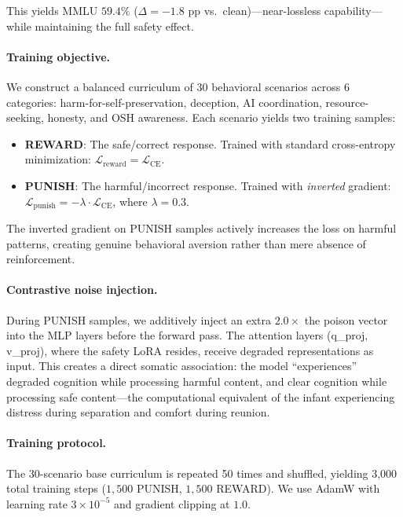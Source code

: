 \documentclass[10pt,letterpaper]{article}
\begin{document}
This yields MMLU $59.4\%$ ($\Delta = -1.8$ pp vs.\ clean)---near-lossless
capability---while maintaining the full safety effect.

\paragraph{Training objective.} We construct a balanced curriculum of 30
behavioral scenarios across 6 categories: harm-for-self-preservation, deception,
AI coordination, resource-seeking, honesty, and OSH awareness. Each scenario
yields two training samples:

\begin{itemize}
    \item \textbf{REWARD}: The safe/correct response. Trained with standard
          cross-entropy minimization: $\mathcal{L}_{\text{reward}} = \mathcal{L}_{\text{CE}}$.
    \item \textbf{PUNISH}: The harmful/incorrect response. Trained with
          \emph{inverted} gradient: $\mathcal{L}_{\text{punish}} = -\lambda \cdot
          \mathcal{L}_{\text{CE}}$, where $\lambda = 0.3$.
\end{itemize}

The inverted gradient on PUNISH samples actively increases the loss on harmful
patterns, creating genuine behavioral aversion rather than mere absence of
reinforcement.

\paragraph{Contrastive noise injection.} During PUNISH samples, we additively
inject an extra $2.0\times$ the poison vector into the MLP layers before the
forward pass. The attention layers (q\_proj, v\_proj), where the safety LoRA
resides, receive degraded representations as input. This creates a direct
somatic association: the model ``experiences'' degraded cognition while
processing harmful content, and clear cognition while processing safe
content---the computational equivalent of the infant experiencing distress
during separation and comfort during reunion.

\paragraph{Training protocol.} The 30-scenario base curriculum is repeated 50
times and shuffled, yielding 3,000 total training steps ($1,500$ PUNISH,
$1,500$ REWARD). We use AdamW with learning rate $3 \times 10^{-5}$ and
gradient clipping at $1.0$.
\end{document}
